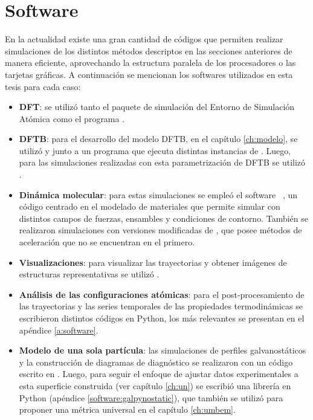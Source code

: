 \section{Software}

En la actualidad existe una gran cantidad de códigos que permiten realizar 
simulaciones de los distintos métodos descriptos en las secciones anteriores 
de manera eficiente, aprovechando la estructura paralela de los procesadores o 
las tarjetas gráficas. A continuación se mencionan los softwares utilizados 
en esta tesis para cada caso:
\begin{itemize}
    \item \textbf{DFT}: se utilizó tanto el paquete de simulación  
        \cite{enkovaara2010, mortensen2005} del Entorno de Simulación Atómica 
        \cite{larsen2017} como el programa   
        \cite{quantum_espresso, quantum_espresso_advanced}.
    \item \textbf{DFTB}: para el desarrollo del modelo DFTB, en el capítulo 
        \ref{ch:modelo}, se utilizó  \cite{hotcent} y
         \cite{tango} junto a un programa  que ejecuta
        distintas instancias de . Luego, para las simulaciones 
        realizadas con esta parametrización de DFTB se utilizó  
        \cite{dftb+}.
    \item \textbf{Dinámica molecular}: para estas simulaciones se empleó el 
        software  ~\cite{lammps1, lammps2}, un código centrado en 
        el modelado de materiales que permite simular con distintos campos de 
        fuerzas, ensambles y condiciones de contorno. También se realizaron 
        simulaciones con versiones modificadas de  \cite{gems}, que 
        posee métodos de aceleración que no se encuentran en el primero.
    \item \textbf{Visualizaciones}: para visualizar las trayectorias y obtener 
        imágenes de estructuras representativas se utilizó  \cite{vmd}.
    \item \textbf{Análisis de las configuraciones atómicas}: para el 
        post-procesamiento de las trayectorias y las series temporales de  las
        propiedades termodinámicas se escribieron distintos códigos en Python,
        los más relevantes se presentan en el apéndice \ref{a:software}.
    \item \textbf{Modelo de una sola partícula}: las simulaciones de perfiles 
        galvanostáticos y la construcción de diagramas de diagnóstico se 
        realizaron con un código escrito en . Luego, para seguir el 
        enfoque de ajustar datos experimentales a esta superficie construida 
        (ver capítulo \ref{ch:un}) se escribió una librería en Python 
        (apéndice \ref{software:galpynostatic}), que también se utilizó para 
        proponer una métrica universal en el capítulo \ref{ch:umbem}.
\end{itemize}

